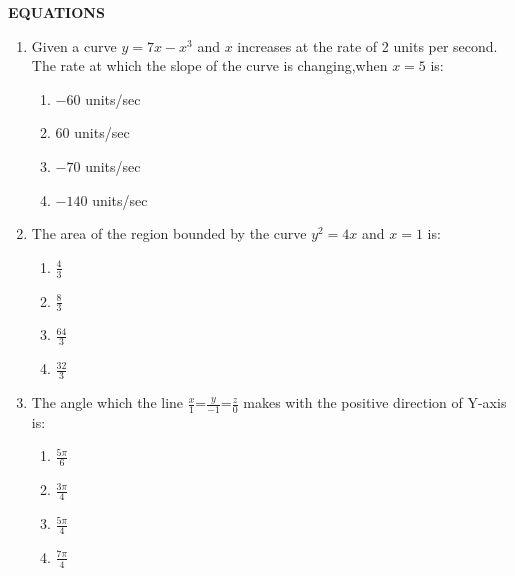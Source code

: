 \documentclass[12pt,-letter paper]{article}
\providecommand{\brak}[1]{\ensuremath{\left(#1\right)}}
\begin{document}
			\begin{center}                                                          \textbf{EQUATIONS}                                                      \end{center}
                         \begin{enumerate}
			\item                                                         Given a curve $ y =7x-x^3 $ and $x$ increases at the rate of 2 units per second.                                           The rate  at which the slope of the curve  is changing,when $x=5$ is:                                                           
                \begin{enumerate}[label={$\brak{\Alph*}$}]                              \item$-60$ units/sec                                                            \item$60$ units/sec                                                     \item$-70$ units/sec                                                    \item$-140$ units/sec
                \end{enumerate}                                                      \item
     The area of the region bounded by the curve $y^2=4x$ and $x=1$ is:                                                                          \begin{enumerate}[label={$\brak{\Alph*}$}]                                      \item $\frac{4}{3}$                                                     \item $\frac{8}{3}$                                                     \item $\frac{64}{3}$                                                    \item $\frac{32}{3}$                                                     \end{enumerate}                                                       \item                                                             The angle which the line $\frac{x}{1}$=$\frac{y}{-1}$=$\frac{z}{0}$ makes with the positive direction of  Y-axis is:                        \begin{enumerate}[label={$\brak{\Alph*}$}]                                      \item $\frac{5\pi}{6}$                                                  \item $\frac{3\pi}{4}$                                                  \item $\frac{5\pi}{4}$                                                  \item $\frac{7\pi}{4}$                                                  \end{enumerate}                                                          \end{enumerate}                                                        \begin{center}  

\end{center}
\end{document}
